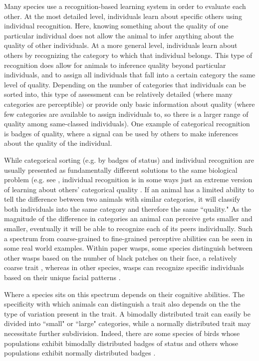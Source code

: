 

Many species use a recognition-based learning system in order to evaluate each other. At the most detailed level, individuals learn about specific others using individual recognition. Here, knowing something about the quality of one particular individual does not allow the animal to infer anything about the quality of other individuals. At a more general level, individuals learn about others by recognizing the category to which that individual belongs. This type of recognition does allow for animals to inference quality beyond particular individuals, and to assign all individuals that fall into a certain category the same level of quality. Depending on the number of categories that individuals can be sorted into, this type of assessment can be relatively detailed (where many categories are perceptible) or provide only basic information about quality (where few categories are available to assign individuals to, so there is a larger range of quality among same-classed individuals). One example of categorical recognition is badges of quality, where a signal can be used by others to make inferences about the quality of the individual. 

While categorical sorting (e.g. by badges of status) and individual recognition are usually presented as fundamentally different solutions to the same biological problem (e.g. see \citep{sheehan2016evotradeoff}, individual recognition is in some ways just an extreme version of learning about others' categorical quality \citep{Barnard:1979fk}. If an animal has a limited ability to tell the difference between two animals with similar categories, it will classify both individuals into the same category and therefore the same ``quality." As the magnitude of the difference in categories an animal can perceive gets smaller and smaller, eventually it will be able to recognize each of its peers individually. Such a spectrum from coarse-grained to fine-grained perceptive abilities can be seen in some real world examples. Within paper wasps, some species distinguish between other wasps based on the number of black patches on their face, a relatively coarse trait \citep{Tibbetts:2004kx}, whereas in other species, wasps can recognize specific individuals based on their unique facial patterns \citep{Tibbetts:2002ys}. 

Where a species sits on this spectrum depends on their cognitive abilities. The specificity with which animals can distinguish a trait also depends on the the type of variation present in the trait. A bimodally distributed trait can easily be divided into ``small" or ``large" categories, while a normally distributed trait may necessitate further subdivision. Indeed, there are some species of birds whose populations exhibit bimodally distributed badges of status and others whose populations exhibit normally distributed badges \citep{Ripoll:2004vn}.

